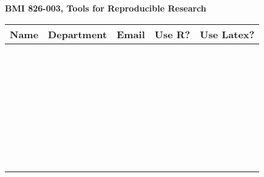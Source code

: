 \documentclass[12pt]{article}
\begin{document}
\begin{center}

\large 
\textbf{BMI 826-003, Tools for Reproducible Research}

\bigskip \bigskip

\begin{tabular}{|l|l|l|l|l|} 
\hline 
\textbf{Name} & \textbf{Department} & \textbf{Email} & \textbf{Use R?} & \textbf{Use Latex?} 
\\ \hline \hline
\hspace{2.1in} & \hspace{0.9in} & \hspace{2.1in} & \hspace{0.5in} & \hspace{0.5in}
\\ \hline 
& & & & \\ \hline
& & & & \\ \hline
& & & & \\ \hline
& & & & \\ \hline  \hline
& & & & \\ \hline
& & & & \\ \hline
& & & & \\ \hline
& & & & \\ \hline
& & & & \\ \hline \hline
& & & & \\ \hline
& & & & \\ \hline
& & & & \\ \hline
& & & & \\ \hline
& & & & \\ \hline \hline
& & & & \\ \hline
& & & & \\ \hline
& & & & \\ \hline
& & & & \\ \hline
& & & & \\ \hline \hline
& & & & \\ \hline
& & & & \\ \hline
& & & & \\ \hline
& & & & \\ \hline
& & & & \\ \hline \hline
& & & & \\ \hline
& & & & \\ \hline
& & & & \\ \hline
& & & & \\ \hline
& & & & \\ \hline \hline
& & & & \\ \hline
& & & & \\ \hline
& & & & \\ \hline
& & & & \\ \hline
& & & & \\ \hline \hline
\end{tabular} \end{center}
\end{document}
